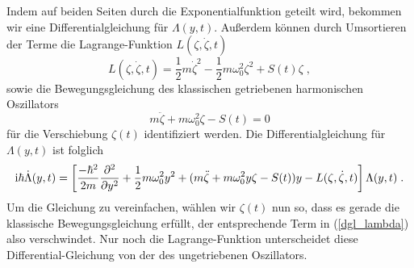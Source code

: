 
      Indem auf beiden Seiten durch die Exponentialfunktion geteilt wird, bekommen wir eine Differentialgleichung für $\Lambda(y,t)$.
      Außerdem können durch Umsortieren der Terme die Lagrange-Funktion $L(\zeta,\dot \zeta, t)$
      \begin{equation}
        L(\zeta,\dot \zeta, t) = \frac{1}{2}m\dot \zeta^2 - \frac{1}{2}m\omega_0^2\zeta^2 + S(t)\zeta \; ,
        \label{lagrange_zeta}
      \end{equation}
        sowie die Bewegungsgleichung des klassischen getriebenen harmonischen  Oszillators~\cite{husimi}
        \begin{equation}
          m\ddot \zeta + m\omega_0^2\zeta - S(t) = 0
          \label{dgl_zeta}
        \end{equation}
      für die Verschiebung $\zeta(t)$ identifiziert werden.
      Die Differentialgleichung für $\Lambda(y,t)$ ist folglich
      \begin{equation}
        \text i \hbar \dot \Lambda(y,t) = \left[ \frac{-\hbar^2}{2m}\frac{\partial^2}{\partial y^2} + \frac{1}{2}m\omega_0^2y^2 + (m\ddot \zeta + m\omega_0^2y\zeta - S(t))y - L(\zeta,\dot \zeta, t) \right]\Lambda(y,t) \; .
        \label{dgl_lambda}
      \end{equation}
      Um die Gleichung zu vereinfachen, wählen wir $\zeta(t)$ nun so, dass es gerade die klassische Bewegungsgleichung erfüllt, der entsprechende Term in (\ref{dgl_lambda}) also verschwindet.
      Nur noch die Lagrange-Funktion unterscheidet diese Differential-Gleichung von der des ungetriebenen Oszillators.

